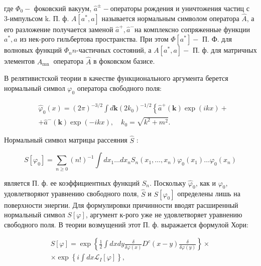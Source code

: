 \documentclass[10pt]{article}
\begin{document}
где $\Phi_{0}-$ фоковский вакуум, $\hat{a}^{ \pm}-$операторы рождения и уничтожения частиц с 3-импульсом k. П. ф. $A\left[a^{*}, a\right]$ называется нормальным символом оператора $\hat{A}$, а его разложение получается заменой $\hat{a}^{+}, \hat{a}^{-}$на комплексно сопряженные функции $a^{*}, a$ из нек-рого гильбертова пространства. При этом $\Phi\left[a^{*}\right]-$ П. Ф. для волновых функций $\Phi_{n} n$-частичных состояний, а $A\left[a^{*}, a\right]-$ П. ф. для матричных элементов $A_{\text {mn }}$ оператора $\hat{A}$ в фоковском базисе.



В релятивистской теории в качестве функционального аргумента берется нормальный символ $\varphi_{0}$ оператора свободного поля:



\[

\begin{aligned}

& \hat{\varphi}_{0}(x)=(2 \pi)^{-3 / 2} \int d \mathbf{k}\left(2 k_{0}\right)^{-1 / 2}\left\{\hat{a}^{+}(\mathbf{k}) \exp (i k x)+\right. \\

&+\hat{a}^{-}(\mathbf{k}) \exp (-i k x), \quad k_{0}=\sqrt{k^{2}+m^{2}} .

\end{aligned}

\]



Нормальный символ матрицы рассеяния $\hat{S}$ :



\[

S\left[\varphi_{0}\right]=\sum_{n \geqslant 0}(n !)^{-1} \int d x_{1} \ldots d x_{n} S_{n}\left(x_{1}, \ldots, x_{n}\right) \varphi_{0}\left(x_{1}\right) \ldots \varphi_{0}\left(x_{n}\right)

\]



является П. ф. ее коэффициентных функций $S_{n}$. Поскольку $\hat{\varphi}_{0}$, как и $\varphi_{0}$, удовлетворяют уравнению свободного поля, $\hat{S}$ и $S\left[\varphi_{0}\right]$ определены лишь на поверхности энергии. Для формулировки причинности вводят расширенный нормальный символ $S[\varphi]$, аргумент к-рого уже не удовлетворяет уравнению свободного поля. В теории возмущений этот П. ф. выражается формулой Хори:



\[

\begin{gathered}

S[\varphi]=\exp \left\{\frac{1}{2} \int d x d y \frac{\delta}{\delta \varphi(x)} D^{c}(x-y) \frac{\delta}{\delta \varphi(y)}\right\} \times \\

\times \exp \left\{i \int d x \mathscr{L}_{I}[\varphi]\right\},

\end{gathered}

\]
\end{document}
